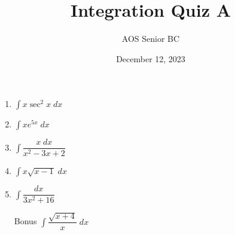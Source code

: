 \documentclass{article}
\begin{document}
\title{Integration Quiz A}
\date{December 12, 2023}
\author{AOS Senior BC}
\maketitle
\begin{enumerate}
	\setlength{\itemsep}{2in}
	\item $\displaystyle \int x \sec^2 x \; dx$
	\item $\displaystyle \int x e^{5x} \; dx$
	\item $\displaystyle \int \dfrac{x \; dx}{x^2-3x+2}$
	\item $\displaystyle \int x \sqrt{x-1} \; dx$
	\item $\displaystyle \int \dfrac{dx}{3x^2+16}$
	\item[Bonus] $\displaystyle \int \dfrac{\sqrt{x+4}}{x} \; dx$
\end{enumerate}
\end{document}

